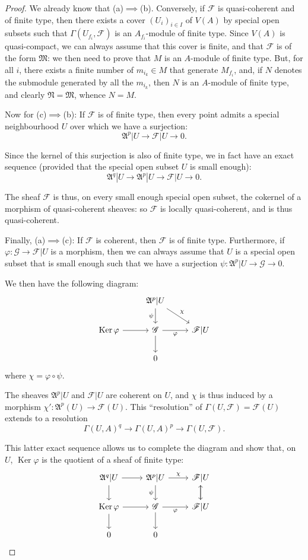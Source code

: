 \documentclass{article}
\theoremstyle{plain}
\theoremstyle{definition}
\newcommand{\sh}{\mathscr}
\DeclareMathOperator{\Ker}{Ker}
\newcommand{\oldpage}[1]{\marginpar{\footnotesize$\Big\vert$ \textit{p.~#1}}}
\begin{document}
\begin{proof}
  We already know that (a)$\implies$(b).
  Conversely, if $\sh{F}$ is quasi-coherent and of finite type, then there exists a cover $(U_i)_{i\in I}$ of $V(A)$ by special open subsets such that $\Gamma(U_{f_i},\sh{F})$ is an $A_{f_i}$-module of finite type.
  Since $V(A)$ is quasi-compact, we can always assume that this cover is finite, and that $\sh{F}$ is of the form $\mathfrak{M}$:
  we then need to prove that $M$ is an $A$-module of finite type.
  But, for all $i$, there exists a finite number of $m_{i_k}\in M$ that generate $M_{f_i}$, and, if $N$ denotes the submodule generated by all the $m_{i_k}$, then $N$ is an $A$-module of finite type, and clearly $\mathfrak{N}=\mathfrak{M}$, whence $N=M$.

  \bigskip
  Now for (c)$\implies$(b):
  If $\sh{F}$ is of finite type, then every point admits a special neighbourhood $U$ over which we have a surjection:
\oldpage{1-10}
  \[
    \mathfrak{A}^p|U \to \sh{F}|U \to 0.
  \]

  Since the kernel of this surjection is also of finite type, we in fact have an exact sequence (provided that the special open subset $U$ is small enough):
  \[
    \mathfrak{A}^q|U \to \mathfrak{A}^p|U \to \sh{F}|U \to 0.
  \]

  The sheaf $\sh{F}$ is thus, on every small enough special open subset, the cokernel of a morphism of quasi-coherent sheaves:
  so $\sh{F}$ is locally quasi-coherent, and is thus quasi-coherent.

  \bigskip
  Finally, (a)$\implies$(c):
  If $\sh{F}$ is coherent, then $\sh{F}$ is of finite type.
  Furthermore, if $\varphi\colon\sh{G}\to\sh{F}|U$ is a morphism, then we can always assume that $U$ is a special open subset that is small enough such that we have a surjection $\psi\colon\mathfrak{A}^p|U\to\sh{G}\to0$.

  We then have the following diagram:
  \[
    \begin{tikzcd}
      & \mathfrak{A}^p|U \dar[swap,"\psi"] \drar["\chi"] &
    \\\Ker\varphi \rar & \sh{G} \rar[swap,"\varphi"] \dar & \sh{F}|U
    \\ & 0 &
    \end{tikzcd}
  \]
  where $\chi=\varphi\circ\psi$.

  The sheaves $\mathfrak{A}^p|U$ and $\sh{F}|U$ are coherent on $U$, and $\chi$ is thus induced by a morphism $\chi'\colon\mathfrak{A}^p(U)\to\sh{F}(U)$.
  This ``resolution'' of $\Gamma(U,\sh{F})=\sh{F}(U)$ extends to a resolution
  \[
    \Gamma(U,A)^q \to \Gamma(U,A)^p \to \Gamma(U,\sh{F}).
  \]

  This latter exact sequence allows us to complete the diagram and show that, on $U$, $\Ker\varphi$ is the quotient of a sheaf of finite type:
  \[
    \begin{tikzcd}
      \mathfrak{A}^q|U \rar \dar & \mathfrak{A}^p|U \rar["\chi"] \dar[swap,"\psi"] & \sh{F}|U \dar
    \\\Ker\varphi \rar \dar & \sh{G} \rar[swap,"\varphi"] \dar & \sh{F}|U \uar
    \\ 0 & 0 &
    \end{tikzcd}
  \]
\end{proof}
\end{document}
